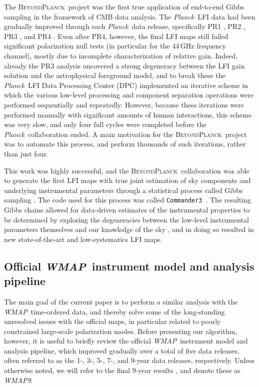 \documentclass[twocolumn]{../../common/aa}
\def\WMAP{\emph{WMAP}}
\def\WMAPnine{\emph{WMAP9}}
\def\Planck{\emph{Planck}}
\def\commanderthree{\texttt{Commander3}}
\newcommand{\BP}{\textsc{BeyondPlanck}}
\newcommand{\bp}{\textsc{BeyondPlanck}}
\begin{document}
The \bp\ project \citep{bp01} was the first true application of end-to-end Gibbs sampling in the framework of CMB data analysis. The \Planck\ LFI data had been gradually improved through each \Planck\ data release, specifically  PR1 \citep{planck2013-p02}, PR2 \citep{planck2014-a03}, PR3 \citep{planck2016-l02}, and PR4 \citep{planck2020-LVII}. Even after PR4, however, the final LFI maps still failed significant polarization null tests (in particular for the 44\,GHz frequency channel), mostly due to incomplete characterization of relative gain. Indeed, already the PR3 analysis  uncovered a strong degeneracy between the LFI gain solution and the astrophysical foreground model, and to break these the \Planck\ LFI Data Processing Center (DPC) implemented an iterative scheme in which the various low-level processing and component separation operations were performed sequentially and repeatedly. However, because these iterations were performed manually with significant amounts of human interactions, this scheme was very slow, and only four full cycles were completed before the \Planck\ collaboration ended. A main motivation for the \BP\ project was to automate this process, and perform thousands of such iterations, rather than just four. 

This work was highly successful, and the \bp\ collaboration was able to generate the first LFI maps with true joint estimation of sky components and underlying instrumental parameters through a statistical process called Gibbs sampling \citep{bp01,bp03,bp10}. The code used for this process was called \commanderthree\ \citep{bp03}. The resulting Gibbs chains allowed for data-driven estimates of the instrumental properties to be determined by exploring the degeneracies between the low-level instrumental parameters themselves and our knowledge of the sky \citep{bp13,bp14}, and in doing so resulted in new state-of-the-art and low-systematics LFI maps.

\subsection{Official \WMAP\ instrument model and analysis pipeline}
\label{sec:wmap_instmodel}

The main goal of the current paper is to perform a similar analysis with the \WMAP\ time-ordered data, and thereby solve some of the long-standing unresolved issues with the official maps, in particular related to poorly constrained large-scale polarization modes. Before presenting our algorithm, however, it is useful to briefly review the official \WMAP\ instrument model and analysis pipeline, which improved gradually over a total of five data releases, often referred to as the 1-, 3-, 5-, 7-, and 9-year data releases, respectively. Unless otherwise noted, we will refer to the final 9-year results \citep{bennett2012}, and denote these as \WMAPnine.
\end{document}
